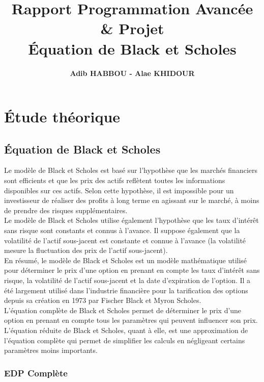 \documentclass[11pt,a4paper]{article}
\title{\textbf{\huge{Rapport Programmation Avancée \& Projet} \\[1cm]Équation de Black et Scholes\\[1cm]}}
\author{\textbf{\Large{Adib HABBOU - Alae KHIDOUR}}}
\date{}
\begin{document}
\begin{titlingpage}
\maketitle
\end{titlingpage}
\newpage

\tableofcontents
\newpage

\section{Étude théorique}

\subsection{Équation de Black et Scholes}

Le modèle de Black et Scholes est basé sur l'hypothèse que les marchés financiers sont efficients et que les prix des actifs reflètent toutes les informations disponibles sur ces actifs. Selon cette hypothèse, il est impossible pour un investisseur de réaliser des profits à long terme en agissant sur le marché, à moins de prendre des risques supplémentaires.\\

Le modèle de Black et Scholes utilise également l'hypothèse que les taux d'intérêt sans risque sont constants et connus à l'avance. Il suppose également que la volatilité de l'actif sous-jacent est constante et connue à l'avance (la volatilité mesure la fluctuation des prix de l'actif sous-jacent).\\

En résumé, le modèle de Black et Scholes est un modèle mathématique utilisé pour déterminer le prix d'une option en prenant en compte les taux d'intérêt sans risque, la volatilité de l'actif sous-jacent et la date d'expiration de l'option. Il a été largement utilisé dans l'industrie financière pour la tarification des options depuis sa création en 1973 par Fischer Black et Myron Scholes.\\

L'équation complète de Black et Scholes permet de déterminer le prix d'une option en prenant en compte tous les paramètres qui peuvent influencer son prix. L'équation réduite de Black et Scholes, quant à elle, est une approximation de l'équation complète qui permet de simplifier les calculs en négligeant certains paramètres moins importants.

\subsubsection{EDP Complète}
\end{document}
